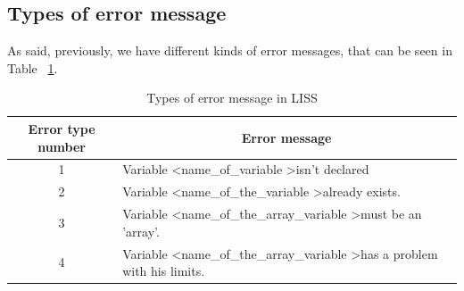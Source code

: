 \documentclass[
  oneside,
  11pt, a4paper,
  footinclude=true,
  headinclude=true,
  cleardoublepage=empty
]{scrbook}
\begin{document}
\subsection{Types of error message}

As said, previously, we have different kinds of error messages, that can be seen in Table ~\ref{tbl:types_error_message}.


\begin{table}[h!]
\centering
\caption{Types of error message in LISS}
\label{tbl:types_error_message}
\begin{tabular}{|c|l|}
\hline
\textbf{Error type number} & \multicolumn{1}{c|}{\textbf{Error message}}                                                                                                                                                                                                                                                                                                                                             \\ \hline
1                          & Variable \textless name\_of\_variable \textgreater isn't declared                                                                                                                                                                                                                                                                                                                       \\ \hline
2                          & Variable \textless name\_of\_the\_variable \textgreater already exists.                                                                                                                                                                                                                                                                                                                 \\ \hline
3                          & Variable \textless name\_of\_the\_array\_variable \textgreater must be an 'array'.                                                                                                                                                                                                                                                                                                      \\ \hline
4                          & Variable \textless name\_of\_the\_array\_variable \textgreater has a problem with his limits.                                                                                                                                                                                                                                                                                           \\ \hline

\end{tabular}
\end{table}
\end{document}
